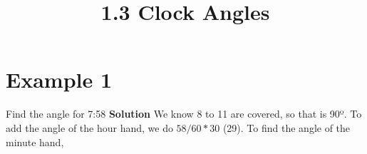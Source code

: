 \documentclass{article}
\begin{document}
	
	\setlength{\droptitle}{-5em}
	\title{1.3 Clock Angles}
	\date{}
	\author{}
	\maketitle
	
	\section*{Example 1}
	Find the angle for 7:58 \newline
	\textbf{Solution} \newline
	We know 8 to 11 are covered, so that is 90º. \newline
	To add the angle of the hour hand, we do $58/60 * 30$ (29). \newline
	To find the angle of the minute hand, 
	
	
\end{document}
